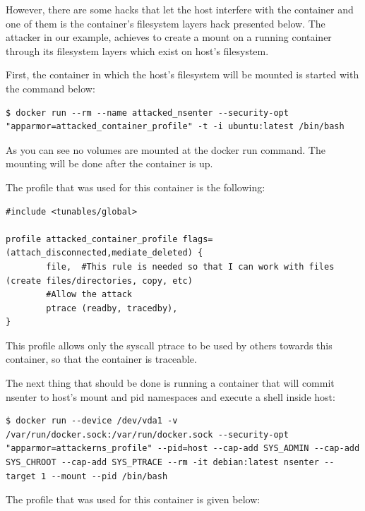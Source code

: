 However, there are some hacks that let the host interfere with the container and one of them is the container's filesystem layers hack presented below. The attacker in our example, achieves to create a mount on a running container through its filesystem layers which exist on host's filesystem.\cite{mountonrunning}

First, the container in which the host's filesystem will be mounted is started with the command below:

\begin{lstlisting}[style=dockercommands]
$ docker run --rm --name attacked_nsenter --security-opt "apparmor=attacked_container_profile" -t -i ubuntu:latest /bin/bash
\end{lstlisting}

As you can see no volumes are mounted at the docker run command. The mounting will be done after the container is up.

The profile that was used for this container is the following:

\begin{lstlisting}[style=Dockerfile, caption={AppArmor profile attacked\_container\_profile}]
#include <tunables/global>

profile attacked_container_profile flags=(attach_disconnected,mediate_deleted) {
        file,  #This rule is needed so that I can work with files (create files/directories, copy, etc)
        #Allow the attack
        ptrace (readby, tracedby),
}
\end{lstlisting}
This profile allows only the syscall ptrace to be used by others towards this container, so that the container is traceable.

The next thing that should be done is running a container that will commit nsenter to host's mount and pid namespaces and execute a shell inside host:

\begin{lstlisting}[style=dockercommands]
$ docker run --device /dev/vda1 -v /var/run/docker.sock:/var/run/docker.sock --security-opt "apparmor=attackerns_profile" --pid=host --cap-add SYS_ADMIN --cap-add SYS_CHROOT --cap-add SYS_PTRACE --rm -it debian:latest nsenter --target 1 --mount --pid /bin/bash
\end{lstlisting}

The profile that was used for this container is given below:

